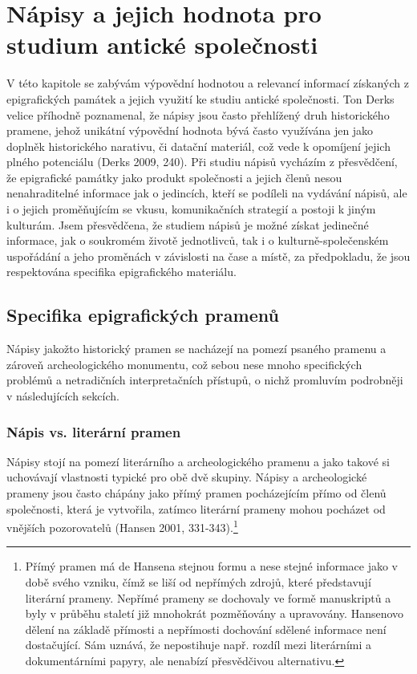 \chapter{Nápisy a jejich hodnota pro studium antické společnosti}
V této kapitole se zabývám výpovědní hodnotou a relevancí informací získaných z epigrafických památek a jejich využití ke studiu antické společnosti. Ton Derks velice příhodně poznamenal, že nápisy jsou často přehlížený druh historického pramene, jehož unikátní výpovědní hodnota bývá často využívána jen jako doplněk historického narativu, či datační materiál, což vede k opomíjení jejich plného potenciálu (Derks 2009, 240). Při studiu nápisů vycházím z přesvědčení, že epigrafické památky jako produkt společnosti a jejich členů nesou nenahraditelné informace jak o jedincích, kteří se podíleli na vydávání nápisů, ale i o jejich proměňujícím se vkusu, komunikačních strategií a postoji k jiným kulturám. Jsem přesvědčena, že studiem nápisů je možné získat jedinečné informace, jak o soukromém životě jednotlivců, tak i o kulturně-společenském uspořádání a jeho proměnách v závislosti na čase a místě, za předpokladu, že jsou respektována specifika epigrafického materiálu.

\section[specifika-epigrafických-pramenů]{Specifika epigrafických pramenů}

Nápisy jakožto historický pramen se nacházejí na pomezí psaného pramenu a zároveň archeologického monumentu, což sebou nese mnoho specifických problémů a netradičních interpretačních přístupů, o nichž promluvím podrobněji v následujících sekcích.

\subsection[nápis-vs.-literární-pramen]{Nápis vs. literární pramen}

Nápisy stojí na pomezí literárního a archeologického pramenu a jako takové si uchovávají vlastnosti typické pro obě dvě skupiny. Nápisy a archeologické prameny jsou často chápány jako přímý pramen pocházejícím přímo od členů společnosti, která je vytvořila, zatímco literární prameny mohou pocházet od vnějších pozorovatelů (Hansen 2001, 331-343).\footnote{Přímý pramen má de Hansena stejnou formu a nese stejné informace jako v době svého vzniku, čímž se liší od nepřímých zdrojů, které představují literární prameny. Nepřímé prameny se dochovaly ve formě manuskriptů a byly v průběhu staletí již mnohokrát pozměňovány a upravovány. Hansenovo dělení na základě přímosti a nepřímosti dochování sdělené informace není dostačující. Sám uznává, že nepostihuje např. rozdíl mezi literárními a dokumentárními papyry, ale nenabízí přesvědčivou alternativu.}

